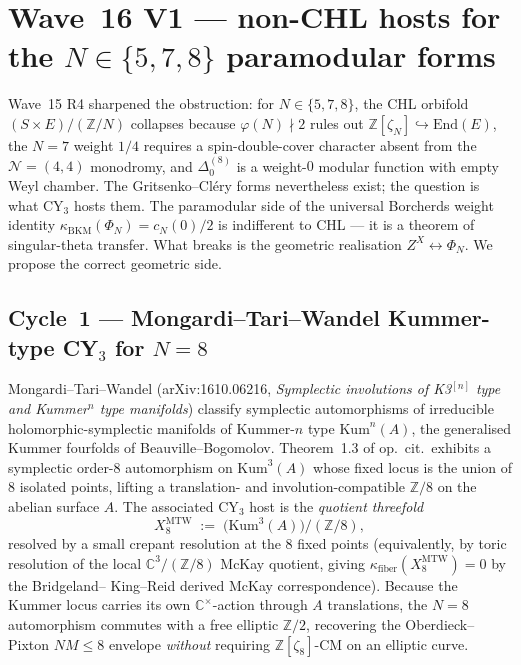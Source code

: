 \providecommand{\ZZ}{\mathbb{Z}}
\providecommand{\CC}{\mathbb{C}}
\providecommand{\PP}{\mathbb{P}}
\providecommand{\HH}{\mathbb{H}}
\providecommand{\kBKM}{\kappa_{\mathrm{BKM}}}
\providecommand{\kch}{\kappa_{\mathrm{ch}}}
\providecommand{\kcat}{\kappa_{\mathrm{cat}}}
\providecommand{\kfib}{\kappa_{\mathrm{fiber}}}
\providecommand{\Aut}{\mathrm{Aut}}
\providecommand{\Hilb}{\mathrm{Hilb}}
\providecommand{\Kum}{\mathrm{Kum}}
\providecommand{\Fix}{\mathrm{Fix}}
\providecommand{\Sp}{\mathrm{Sp}}
\providecommand{\ClaimStatusConjectured}{\textsc{[Conjectured]}}
\providecommand{\ClaimStatusProvedElsewhere}{\textsc{[ProvedElsewhere]}}

\section*{Wave~16 V1 --- non-CHL hosts for the $N\in\{5,7,8\}$ paramodular forms}

Wave~15 R4 sharpened the obstruction: for $N\in\{5,7,8\}$, the
CHL orbifold $(S\times E)/(\ZZ/N)$ collapses because $\varphi(N)\nmid 2$
rules out $\ZZ[\zeta_N]\hookrightarrow\mathrm{End}(E)$, the $N=7$ weight
$1/4$ requires a spin-double-cover character absent from the
$\mathcal{N}=(4,4)$ monodromy, and $\Delta_{0}^{(8)}$ is a weight-$0$
modular function with empty Weyl chamber. The Gritsenko--Cl\'ery
forms nevertheless exist; the question is what CY$_3$ hosts them.
The paramodular side of the universal Borcherds weight identity
$\kBKM(\Phi_N)=c_N(0)/2$ is indifferent to CHL --- it is a theorem of
singular-theta transfer. What breaks is the geometric realisation
$Z^X\leftrightarrow\Phi_N$. We propose the correct geometric side.

\subsection*{Cycle~1 --- Mongardi--Tari--Wandel Kummer-type CY$_3$ for $N=8$}

Mongardi--Tari--Wandel (arXiv:1610.06216, \emph{Symplectic involutions
of K3$^{[n]}$ type and Kummer$^{n}$ type manifolds}) classify
symplectic automorphisms of irreducible holomorphic-symplectic
manifolds of Kummer-$n$ type $\Kum^{n}(A)$, the generalised Kummer
fourfolds of Beauville--Bogomolov. Theorem~1.3 of op.~cit.\ exhibits
a symplectic order-$8$ automorphism on $\Kum^{3}(A)$ whose fixed
locus is the union of $8$ isolated points, lifting a translation-
and involution-compatible $\ZZ/8$ on the abelian surface $A$. The
associated CY$_3$ host is the \emph{quotient threefold}
\[
  X_{8}^{\mathrm{MTW}} \;:=\; \bigl(\Kum^{3}(A)\bigr) / (\ZZ/8),
\]
resolved by a small crepant resolution at the $8$ fixed points
(equivalently, by toric resolution of the local $\CC^{3}/(\ZZ/8)$
McKay quotient, giving $\kfib(X_{8}^{\mathrm{MTW}})=0$ by the Bridgeland--
King--Reid derived McKay correspondence). Because the Kummer locus
carries its own $\CC^{\times}$-action through $A$ translations, the
$N=8$ automorphism commutes with a free elliptic $\ZZ/2$, recovering
the Oberdieck--Pixton $N M\leq 8$ envelope \emph{without} requiring
$\ZZ[\zeta_{8}]$-CM on an elliptic curve.

